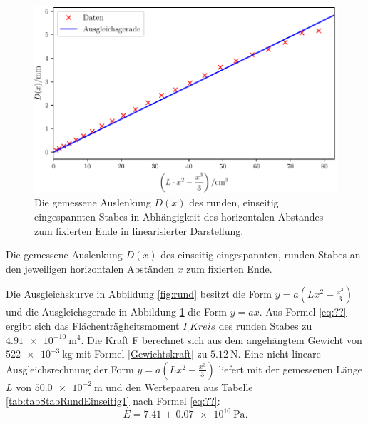 \begin{figure}
	\centering
	\includegraphics[width=\linewidth-70pt,height=\textheight-70pt,keepaspectratio]{content/images/StabRundEinseitig2.pdf}
	\caption{Die gemessene Auslenkung $D(x)$ des runden, einseitig eingespannten Stabes in Abhängigkeit des horizontalen Abstandes zum fixierten Ende in linearisierter Darstellung.}
	\label{fig:rundlinear}
\end{figure}
\begin{table}
	\caption{Die gemessene Auslenkung $D(x)$ des einseitig eingespannten, runden Stabes an den jeweiligen horizontalen Abständen $x$ zum fixierten Ende.}
	\begin{minipage}{0.5\textwidth}
		\centering
		
	\end{minipage}
	\begin{minipage}{0.5\textwidth}
		\centering
		
	\end{minipage}
\end{table}
Die Ausgleichskurve in Abbildung \ref{fig:rund} besitzt die Form $y = a ( L x^2 - \frac{x^3}{3} ) $ und die Ausgleichsgerade in Abbildung \ref{fig:rundlinear} die Form $y=a x$. Aus Formel \eqref{eq:??} ergibt sich das Flächenträgheitsmoment $I_.{Kreis}$ des runden Stabes  zu $\SI{4.91e-10}{\metre\tothe{4}}$. Die Kraft F berechnet sich aus dem angehängtem Gewicht von $\SI{522e-3}{\kilogram}$ mit Formel \eqref{Gewichtskraft} zu $\SI{5.12}{\newton}$. Eine nicht lineare Ausgleichsrechnung der Form $y = a ( L x^2 - \frac{x^3}{3})$ liefert mit der gemessenen Länge $L$ von $\SI{50.0e-2}{\metre}$ und den Wertepaaren aus Tabelle \ref{tab:tabStabRundEinseitig1} nach Formel \eqref{eq:??}:
\begin{displaymath}
	E = \SI{7.41(7)e10}{\pascal}\text{.}
\end{displaymath}

